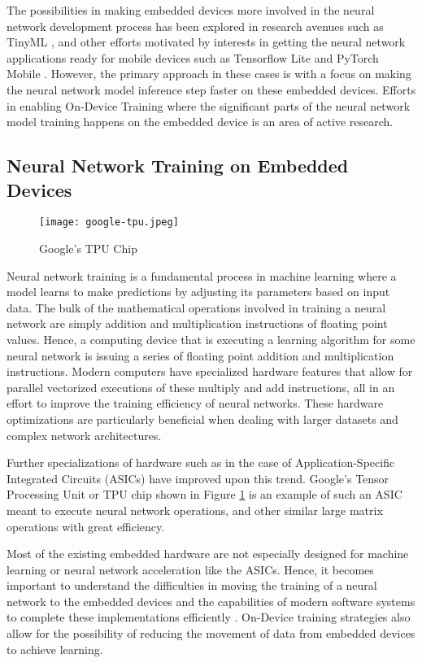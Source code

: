 The possibilities in making embedded devices more involved in the neural network development process has been explored in research avenues such as TinyML \cite{tinyml}, and other efforts motivated by interests in getting the neural network applications ready for mobile devices such as Tensorflow Lite \cite{tfl} and PyTorch Mobile \cite{pytorch-mobile}. However, the primary approach in these cases is with a focus on making the neural network model inference step faster on these embedded devices. Efforts in enabling On-Device Training where the significant parts of the neural network model training happens on the embedded device is an area of active research.

\subsection{Neural Network Training on Embedded Devices}

\begin{figure}[h]
	\centering
	\texttt{[image: google-tpu.jpeg]}
	\caption{Google's TPU Chip}
	\label{fig:google-tpu}
\end{figure}

Neural network training is a fundamental process in machine learning where a model learns to make predictions by adjusting its parameters based on input data. The bulk of the mathematical operations involved in training a neural network are simply addition and multiplication instructions of floating point values. Hence, a computing device that is executing a learning algorithm for some neural network is issuing a series of floating point addition and multiplication instructions. Modern computers have specialized hardware features that allow for parallel vectorized executions of these multiply and add instructions, all in an effort to improve the training efficiency of neural networks. These hardware optimizations are particularly beneficial when dealing with larger datasets and complex network architectures.

Further specializations of hardware such as in the case of Application-Specific Integrated Circuits (ASICs) have improved upon this trend. Google's Tensor Processing Unit or TPU chip shown in Figure \ref{fig:google-tpu} is an example of such an ASIC meant to execute neural network operations, and other similar large matrix operations with great efficiency.

Most of the existing embedded hardware are not especially designed for machine learning or neural network acceleration like the ASICs. Hence, it becomes important to understand the difficulties in moving the training of a neural network to the embedded devices and the capabilities of modern software systems to complete these implementations efficiently \cite{zhu2023ondevice}. On-Device training strategies also allow for the possibility of reducing the movement of data from embedded devices to achieve learning.

